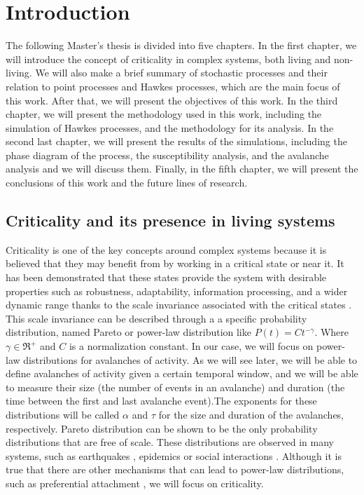 \chapter{Introduction}\label{ch:intro}

The following Master's thesis is divided into five chapters. In the first chapter, we will introduce the concept of criticality in complex systems, both living and non-living.  
We will also make a brief summary of stochastic processes and their relation to point processes and Hawkes processes, which are the main focus of this work.
After that, we will present the objectives of this work. In the third chapter, we will present the methodology used in this work, including the simulation of Hawkes processes, 
and the methodology for its analysis. In the second last chapter, we will present the results of the simulations, including the phase diagram of the process, the 
susceptibility analysis, and the avalanche analysis and we will discuss them. Finally, in the fifth chapter, we will present the conclusions of this work and the future lines of research.

\section{Criticality and its presence in living systems}

Criticality is one of the key concepts around complex systems because it is believed that they may benefit from by working in a critical state or near it. It has been demonstrated that
these states provide the system with desirable properties such as robustness, adaptability, information processing, and a wider dynamic range thanks to the scale invariance associated with the
critical states \cite{munoz2018colloquium}. This scale invariance can be described through a a specific probability distribution, named Pareto or power-law distribution like $P(t) = Ct^{-\gamma}$.
Where $\gamma\in\Re^+$ and $C$ is a normalization constant. In our case, we will focus on power-law distributions for avalanches of activity. As we will see later, we will be able to define 
avalanches of activity given a certain temporal window, and we will be able to measure their size (the number of events in an avalanche) and duration (the time between the first and last 
avalanche event).The exponents for these distributions will be called $\alpha$ and $\tau$ for the size and duration of the avalanches, respectively.
Pareto distribution can be shown to be the only probability distributions that are free of scale. These distributions are observed
in many systems, such as earthquakes \cite{baiesi2004scale}, epidemics \cite{pastor2015epidemic} or social interactions \cite{castellano2009statistical, aparicio2015model}. 
Although it is true that there are other mechanisms that can lead to power-law distributions, such as preferential attachment \cite{barabasi1999emergence}, we will focus on criticality. 

